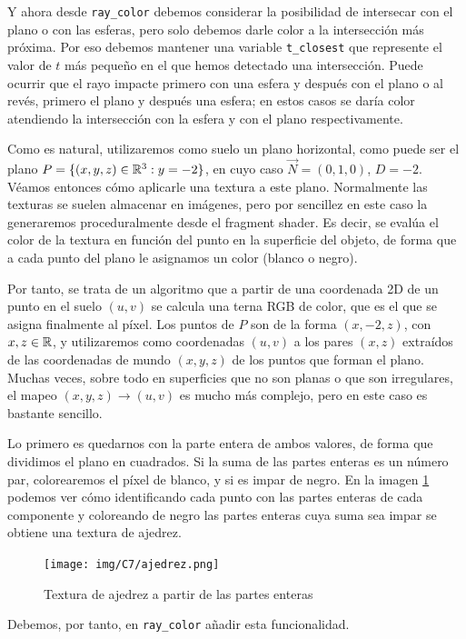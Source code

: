 Y ahora desde \verb|ray_color| debemos considerar la posibilidad de intersecar con el plano o con las esferas, pero solo debemos darle color a la intersección más próxima. Por eso debemos mantener una variable \verb|t_closest| que represente el valor de $t$ más pequeño en el que hemos detectado una intersección. Puede ocurrir que el rayo impacte primero con una esfera y después con el plano o al revés, primero el plano y después una esfera; en estos casos se daría color atendiendo la intersección con la esfera y con el plano respectivamente. 

Como es natural, utilizaremos como suelo un plano horizontal, como puede ser el plano $P=\{(x,y,z)\in\mathbb{R}^3:y=-2\}$, en cuyo caso $\vec N=(0,1,0)$, $D=-2$. Véamos entonces cómo aplicarle una textura a este plano. Normalmente las texturas se suelen almacenar en imágenes, pero por sencillez en este caso la generaremos proceduralmente desde el fragment shader. Es decir, se evalúa el color de la textura en función del punto en la superficie del objeto, de forma que a cada punto del plano le asignamos un color (blanco o negro). 

Por tanto, se trata de un algoritmo que a partir de una coordenada 2D de un punto en el suelo $(u,v)$ se calcula una terna RGB de color, que es el que se asigna finalmente al píxel. Los puntos de $P$ son de la forma $(x,-2,z)$, con $ x,z\in\mathbb{R}$, y utilizaremos como coordenadas $(u,v)$ a los pares $(x,z)$ extraídos de las coordenadas de mundo $(x,y,z)$ de los puntos que forman el plano. Muchas veces, sobre todo en superficies que no son planas o que son irregulares, el mapeo $(x,y,z)\longrightarrow(u,v)$ es mucho más complejo, pero en este caso es bastante sencillo.

Lo primero es quedarnos con la parte entera de ambos valores, de forma que dividimos el plano en cuadrados. Si la suma de las partes enteras es un número par, colorearemos el píxel de blanco, y si es impar de negro. En la imagen \ref{fig:ajedrez} podemos ver cómo identificando cada punto con las partes enteras de cada componente y coloreando de negro las partes enteras cuya suma sea impar se obtiene una textura de ajedrez.

\begin{figure} [ht]
    \centering
    \texttt{[image: img/C7/ajedrez.png]}
    \caption{Textura de ajedrez a partir de las partes enteras}
    \label{fig:ajedrez}
\end{figure}

Debemos, por tanto, en \verb|ray_color| añadir esta funcionalidad.

